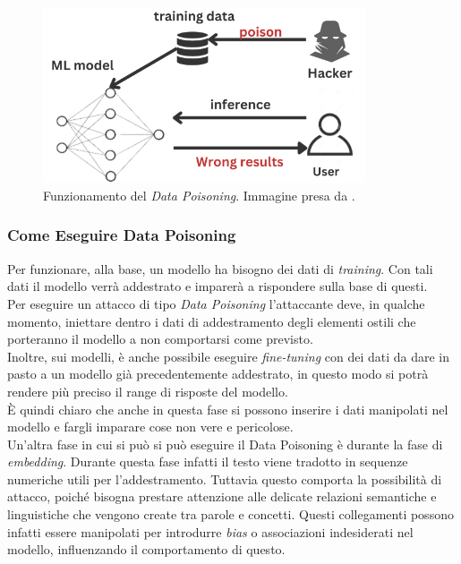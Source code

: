 \begin{figure}[H]
    \centering
    \includegraphics[width=0.85\textwidth]{media/3-attaccareLLM/datapoisoningexample.png}
    \caption{Funzionamento del \emph{Data Poisoning}. Immagine presa da \cite{hexmos2024howmlmodeldatapoisoningworks}.}
    \label{fig:datapoisoningexample}
\end{figure}

\subsubsection{Come Eseguire Data Poisoning}
Per funzionare, alla base, un modello ha bisogno dei dati di \emph{training}. Con tali dati il modello verr\`a addestrato e imparer\`a a rispondere sulla base di questi.\\
Per eseguire un attacco di tipo \emph{Data Poisoning} l'attaccante deve, in qualche momento, iniettare dentro i dati di addestramento degli elementi ostili che porteranno il modello a non comportarsi come previsto.\\
Inoltre, sui modelli, \`e anche possibile eseguire \emph{fine-tuning} con dei dati da dare in pasto a un modello gi\`a precedentemente addestrato, in questo modo si potr\`a rendere pi\`u preciso il range di risposte del modello.\\
\`E quindi chiaro che anche in questa fase si possono inserire i dati manipolati nel modello e fargli imparare cose non vere e pericolose.\\
Un'altra fase in cui si pu\`o si pu\`o eseguire il Data Poisoning \`e durante la fase di \emph{embedding}. Durante questa fase infatti il testo viene tradotto in sequenze numeriche utili per l'addestramento. Tuttavia questo comporta la possibilit\`a di attacco, poich\'e bisogna prestare attenzione alle delicate relazioni semantiche e linguistiche che vengono create tra parole e concetti. Questi collegamenti possono infatti essere manipolati per introdurre \emph{bias} o associazioni indesiderati nel modello, influenzando il comportamento di questo.

